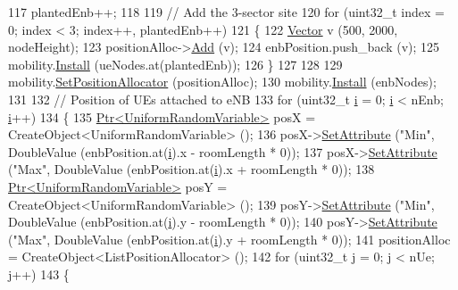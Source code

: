 \begin{DoxyCode}
117   plantedEnb++;
118 
119   \textcolor{comment}{// Add the 3-sector site}
120   \textcolor{keywordflow}{for} (uint32\_t index = 0; index < 3; index++, plantedEnb++)
121     \{
122       \hyperlink{classns3_1_1Vector3D_a7e59b47bc94c9cb1dadff68c1d0112d8}{Vector} v (500, 2000, nodeHeight);
123       positionAlloc->\hyperlink{classns3_1_1ListPositionAllocator_a460e82f015ac012a73ba0ea0cccb3486}{Add} (v);
124       enbPosition.push\_back (v);
125       mobility.\hyperlink{classns3_1_1MobilityHelper_a07737960ee95c0777109cf2994dd97ae}{Install} (ueNodes.at(plantedEnb));
126     \}
127 
128 
129   mobility.\hyperlink{classns3_1_1MobilityHelper_ac59d5295076be3cc11021566713a28c5}{SetPositionAllocator} (positionAlloc);
130   mobility.\hyperlink{classns3_1_1MobilityHelper_a07737960ee95c0777109cf2994dd97ae}{Install} (enbNodes);
131 
132   \textcolor{comment}{// Position of UEs attached to eNB}
133   \textcolor{keywordflow}{for} (uint32\_t \hyperlink{bernuolliDistribution_8m_a6f6ccfcf58b31cb6412107d9d5281426}{i} = 0; \hyperlink{bernuolliDistribution_8m_a6f6ccfcf58b31cb6412107d9d5281426}{i} < nEnb; \hyperlink{bernuolliDistribution_8m_a6f6ccfcf58b31cb6412107d9d5281426}{i}++)
134     \{
135       \hyperlink{classns3_1_1Ptr}{Ptr<UniformRandomVariable>} posX = CreateObject<UniformRandomVariable> ();
136       posX->\hyperlink{classns3_1_1ObjectBase_ac60245d3ea4123bbc9b1d391f1f6592f}{SetAttribute} (\textcolor{stringliteral}{"Min"}, DoubleValue (enbPosition.at(\hyperlink{bernuolliDistribution_8m_a6f6ccfcf58b31cb6412107d9d5281426}{i}).x - roomLength * 0));
137       posX->\hyperlink{classns3_1_1ObjectBase_ac60245d3ea4123bbc9b1d391f1f6592f}{SetAttribute} (\textcolor{stringliteral}{"Max"}, DoubleValue (enbPosition.at(\hyperlink{bernuolliDistribution_8m_a6f6ccfcf58b31cb6412107d9d5281426}{i}).x + roomLength * 0));
138       \hyperlink{classns3_1_1Ptr}{Ptr<UniformRandomVariable>} posY = CreateObject<UniformRandomVariable> ();
139       posY->\hyperlink{classns3_1_1ObjectBase_ac60245d3ea4123bbc9b1d391f1f6592f}{SetAttribute} (\textcolor{stringliteral}{"Min"}, DoubleValue (enbPosition.at(\hyperlink{bernuolliDistribution_8m_a6f6ccfcf58b31cb6412107d9d5281426}{i}).y - roomLength * 0));
140       posY->\hyperlink{classns3_1_1ObjectBase_ac60245d3ea4123bbc9b1d391f1f6592f}{SetAttribute} (\textcolor{stringliteral}{"Max"}, DoubleValue (enbPosition.at(\hyperlink{bernuolliDistribution_8m_a6f6ccfcf58b31cb6412107d9d5281426}{i}).y + roomLength * 0));
141       positionAlloc = CreateObject<ListPositionAllocator> ();
142       \textcolor{keywordflow}{for} (uint32\_t j = 0; j < nUe; j++)
143         \{

\end{DoxyCode}
